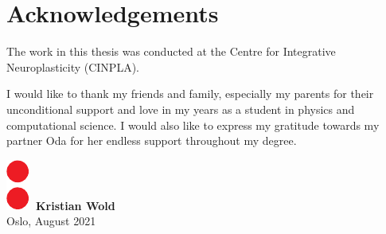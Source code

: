 \chapter*{Acknowledgements}
\thispagestyle{plain}

The work in this thesis was conducted at the Centre for Integrative Neuroplasticity (CINPLA).




I would like to thank my friends and family, especially my parents for their unconditional support and love in my years as a student in physics and computational science. I would also like to express my gratitude towards my partner Oda for her endless support throughout my degree. 
\\ [8 pt]

\begin{flushright}
\includegraphics[height = 1.5ex]{latex/latex-report/3_Images/Logo/UiO/uio-colon.pdf}\, \textbf{Kristian Wold}
\\
Oslo, August 2021
\end{flushright}
